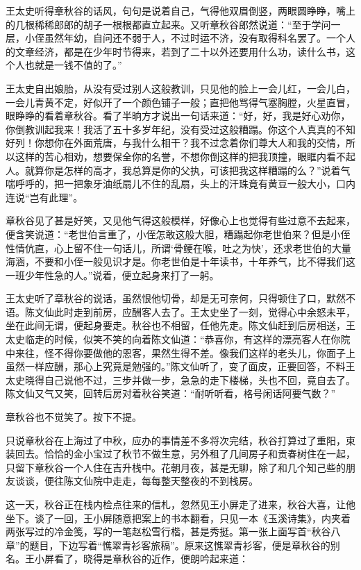 \documentclass[12pt,UTF8]{ctexbook}
\begin{document}
{{{王太史听得章秋谷的话风，句句是说着自己，气得他双眉倒竖，两眼圆睁睁，嘴上的几根稀稀郎郎的胡子一根根都直立起来。又听章秋谷郎然说道：“至于学问一层，小侄虽然年幼，自问还不弱于人，不过时运不济，没有取得科名罢了。一个人的文章经济，都是在少年时节得来，若到了二十以外还要用什么功，读什么书，这个人也就是一钱不值的了。”

王太史自出娘胎，从没有受过别人这般教训，只见他的脸上一会儿红，一会儿白，一会儿青黄不定，好似开了一个颜色铺子一般；直把他骂得气塞胸膛，火星直冒，眼睁睁的看着章秋谷。看了半晌方才说出一句话来道：“好，好，我是好心劝你，你倒教训起我来！我活了五十多岁年纪，没有受过这般糟蹋。你这个人真真的不知好列！你想你在外面荒唐，与我什么相干？我不过念着你们尊大人和我的交情，所以这样的苦心相劝，想要保全你的名誉，不想你倒这样的把我顶撞，眼眶内看不起人。就算你是怎样的高才，我总算是你的父执，可该把我这样糟蹋的么？”说着气喘呼呼的，把一把象牙油纸扇儿不住的乱扇，头上的汗珠竟有黄豆一般大小，口内连说“岂有此理”。

章秋谷见了甚是好笑，又见他气得这般模样，好像心上也觉得有些过意不去起来，便含笑说道：“老世伯言重了，小侄怎敢这般大胆，糟蹋起你老世伯来？但是小侄性情伉直，心上留不住一句话儿，所谓‘骨鲠在喉，吐之为快’，还求老世伯的大量海涵，不要和小侄一般见识才是。你老世伯是十年读书，十年养气，比不得我们这一班少年性急的人。”说着，便立起身来打了一躬。

王太史听了章秋谷的说话，虽然恨他切骨，却是无可奈何，只得顿住了口，默然不语。陈文仙此时走到前房，应酬客人去了。王太史坐了一刻，觉得心中余怒未平，坐在此间无谓，便起身要走。秋谷也不相留，任他先走。陈文仙赶到后房相送，王太史临走的时候，似笑不笑的向着陈文仙道：“恭喜你，有这样的漂亮客人在你院中来往，怪不得你要做他的恩客，果然生得不差。像我们这样的老头儿，你面子上虽然一样应酬，那心上究竟是勉强的。”陈文仙听了，变了面皮，正要回答，不料王太史晓得自己说他不过，三步并做一步，急急的走下楼梯，头也不回，竟自去了。陈文仙又气又笑，回转后房对着秋谷笑道：“耐听听看，格号闲话阿要气数？”

章秋谷也不觉笑了。按下不提。

只说章秋谷在上海过了中秋，应办的事情差不多将次完结，秋谷打算过了重阳，束装回去。恰恰的金小宝过了秋节不做生意，另外租了几间房子和贡春树住在一起，只留下章秋谷一个人住在吉升栈中。花朝月夜，甚是无聊，除了和几个知己些的朋友谈谈，便往陈文仙院中走走，每每整天整夜的不到栈房。

这一天，秋谷正在栈内检点往来的信札，忽然见王小屏走了进来，秋谷大喜，让他坐下。谈了一回，王小屏随意把案上的书本翻看，只见一本《玉溪诗集》，内夹着两张写过的冷金笺，写的一笔赵松雪行楷，甚是秀挺。第一张上面写首“秋谷八章”的题目，下边写着“憔翠青衫客旅稿”。原来这憔翠青衫客，便是章秋谷的别名。王小屏看了，晓得是章秋谷的近作，便朗吟起来道：

}}}
\end{document}
